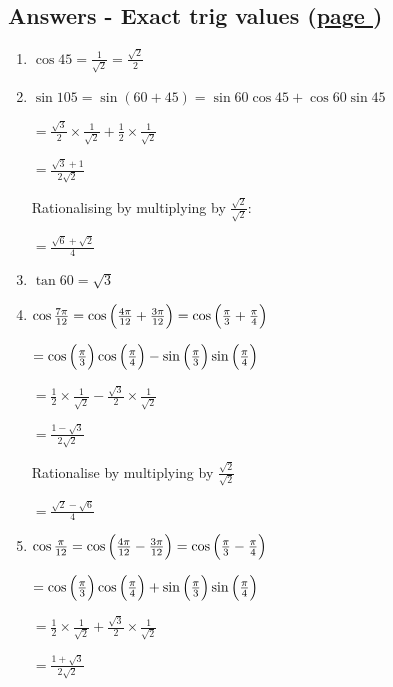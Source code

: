 \documentclass[../main.tex]{subfiles}
\begin{document}
\hypertarget{exacttriganswers}{\subsection*{Answers - Exact trig values (\hyperlink{exacttriglink}{page \pageref{Exact trig values}})}}

\label{Exact trig values answers}
\begin{enumerate}[itemsep=0.4cm]
    \item 
    $\cos{45}=\frac{1}{\sqrt{2}}=\frac{\sqrt{2}}{2}$

    \item 
    $\sin{105}=\sin{(60+45)}=\sin{60}\cos{45}+\cos{60}\sin{45}$

    $=\frac{\sqrt{3}}{2}\times \frac{1}{\sqrt{2}}+\frac{1}{2}\times \frac{1}{\sqrt{2}}$

    $=\frac{\sqrt{3}+1}{2\sqrt{2}}$

    Rationalising by multiplying by $\frac{\sqrt{2}}{\sqrt{2}}$:

    $=\frac{\sqrt{6}+\sqrt{2}}{4}$

    \item 
    $\tan{60}=\sqrt{3}$

    \item 
    $\cos{\frac{7\pi}{12}}=\cos{\Bigl(\frac{4\pi}{12}+\frac{3\pi}{12}\Bigr)}=\cos{\Bigl(\frac{\pi}{3}+\frac{\pi}{4}\Bigr)}$

    $=\cos{\Bigl(\frac{\pi}{3}}\Bigr)\cos{\Bigl(\frac{\pi}{4}}\Bigr)-\sin{\Bigl(\frac{\pi}{3}}\Bigr)\sin{\Bigl(\frac{\pi}{4}}\Bigr)$

    $=\frac{1}{2}\times \frac{1}{\sqrt{2}}-\frac{\sqrt{3}}{2}\times \frac{1}{\sqrt{2}}$

    $=\frac{1-\sqrt{3}}{2\sqrt{2}}$

    Rationalise by multiplying by $\frac{\sqrt{2}}{\sqrt{2}}$

    $=\frac{\sqrt{2}-\sqrt{6}}{4}$

    \item 
    $\cos{\frac{\pi}{12}}=\cos{\Bigl(\frac{4\pi}{12}-\frac{3\pi}{12}\Bigr)}=\cos{\Bigl(\frac{\pi}{3}-\frac{\pi}{4}\Bigr)}$

    $=\cos{\Bigl(\frac{\pi}{3}}\Bigr)\cos{\Bigl(\frac{\pi}{4}}\Bigr)+\sin{\Bigl(\frac{\pi}{3}}\Bigr)\sin{\Bigl(\frac{\pi}{4}}\Bigr)$

    $=\frac{1}{2}\times \frac{1}{\sqrt{2}}+\frac{\sqrt{3}}{2}\times \frac{1}{\sqrt{2}}$

    $=\frac{1+\sqrt{3}}{2\sqrt{2}}$


\end{enumerate}
\end{document}

